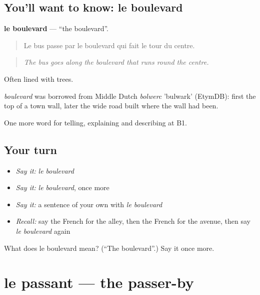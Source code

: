 \subsection*{You'll want to know: le boulevard}
\textbf{le boulevard} — \textquotedblleft{}the boulevard\textquotedblright{}.

\begin{quote}
Le bus passe par le boulevard qui fait le tour du centre.
\end{quote}

\begin{quote}
\emph{The bus goes along the boulevard that runs round the centre.}
\end{quote}

Often lined with trees.

\begin{cousinweb}
\emph{boulevard} was borrowed from Middle Dutch \emph{bolwerc} 'bulwark' (EtymDB): first the top of a town wall, later the wide road built where the wall had been.
\end{cousinweb}

\begin{grammarlens}[title={What you've built}]
One more word for telling, explaining and describing at B1.
\end{grammarlens}

\subsection*{Your turn}
\begin{itemize}
\raggedright
  \item \emph{Say it:} \emph{le boulevard}
  \item \emph{Say it:} \emph{le boulevard}, once more
  \item \emph{Say it:} a sentence of your own with \emph{le boulevard}
  \item \emph{Recall:} say the French for the alley, then the French for the avenue, then say \emph{le boulevard} again
\end{itemize}

\begin{tcolorbox}[breakable,colback=teal!4,colframe=teal!35!black,title={Before you move on}]
What does le boulevard mean? (\textquotedblleft{}The boulevard\textquotedblright{}.) Say it once more.
\end{tcolorbox}
\section[le passant]{le passant — the passer-by}

